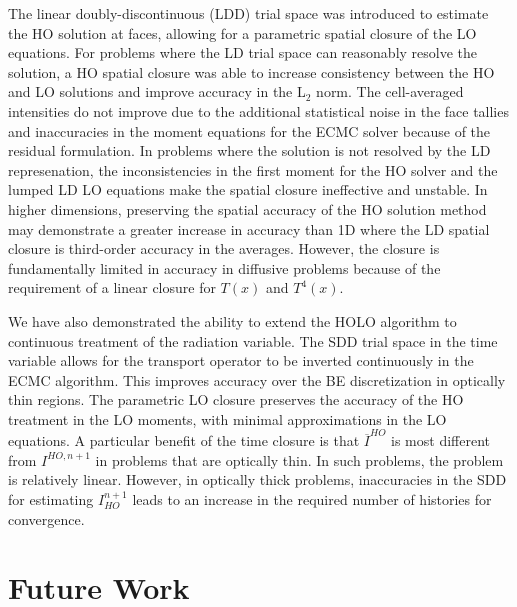 The linear doubly-discontinuous (LDD) trial space was introduced to estimate the HO
solution at faces, allowing for a parametric spatial closure of the LO equations. 
For problems where the LD trial space can reasonably resolve the solution, a 
HO spatial closure was able to increase consistency between the HO and LO solutions and improve
accuracy in the L$_2$ norm.  The cell-averaged intensities do not improve due to the additional statistical noise
in the face tallies and inaccuracies in the moment equations for the ECMC solver because of the residual formulation.
In problems where the solution is not resolved by the LD represenation, the
inconsistencies in the first moment for the HO solver and the lumped LD LO equations make
the spatial closure ineffective and unstable.
In higher dimensions, preserving the spatial accuracy of the HO solution method may
demonstrate a greater increase in accuracy than 1D where the LD spatial closure is
third-order accuracy in the averages.  However, the closure is fundamentally limited in
accuracy in diffusive problems because of the requirement of a linear closure for $T(x)$ and $T^4(x)$. 

We have also demonstrated the ability to extend the HOLO algorithm to continuous treatment of the radiation 
variable.  The SDD trial space in the time variable allows for the transport operator to be inverted
continuously in the ECMC algorithm.  This improves accuracy over the BE discretization in optically thin regions.
The parametric LO closure preserves the accuracy of the HO treatment in the LO moments,
with minimal approximations in the LO equations. 
A particular benefit of the time closure is that $\overline I^{HO}$ is most different
from $I^{HO,n+1}$ in problems that are optically thin.  In such problems,
the problem is relatively linear.  However, in optically thick problems, inaccuracies
in the SDD for estimating $I_{HO}^{n+1}$ leads to an increase in the required number of
histories for convergence.

\section{Future Work} 

